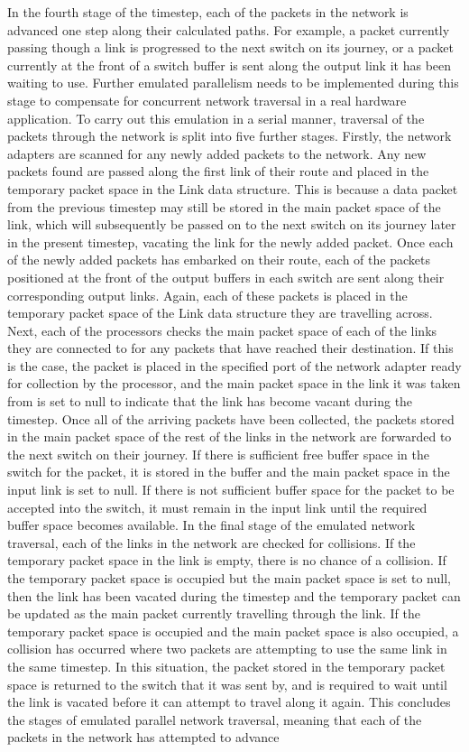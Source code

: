 \documentclass[a4paper, 12pt]{article}
\begin{document}
In the fourth stage of the timestep, each of the packets in the network is advanced one step along their calculated paths. For example, a packet currently passing though a link is progressed to the next switch on its journey, or a packet currently at the front of a switch buffer is sent along the output link it has been waiting to use. Further emulated parallelism needs to be implemented during this stage to compensate for concurrent network traversal in a real hardware application. To carry out this emulation in a serial manner, traversal of the packets through the network is split into five further stages. Firstly, the network adapters are scanned for any newly added packets to the network. Any new packets found are passed along the first link of their route and placed in the temporary packet space in the Link data structure. This is because a data packet from the previous timestep may still be stored in the main packet space of the link, which will subsequently be passed on to the next switch on its journey later in the present timestep, vacating the link for the newly added packet. Once each of the newly added packets has embarked on their route, each of the packets positioned at the front of the output buffers in each switch are sent along their corresponding output links. Again, each of these packets is placed in the temporary packet space of the Link data structure they are travelling across. Next, each of the processors checks the main packet space of each of the links they are connected to for any packets that have reached their destination. If this is the case, the packet is placed in the specified port of the network adapter ready for collection by the processor, and the main packet space in the link it was taken from is set to null to indicate that the link has become vacant during the timestep. Once all of the arriving packets have been collected, the packets stored in the main packet space of the rest of the links in the network are forwarded to the next switch on their journey. If there is sufficient free buffer space in the switch for the packet, it is stored in the buffer and the main packet space in the input link is set to null. If there is not sufficient buffer space for the packet to be accepted into the switch, it must remain in the input link until the required buffer space becomes available. In the final stage of the emulated network traversal, each of the links in the network are checked for collisions. If the temporary packet space in the link is empty, there is no chance of a collision. If the temporary packet space is occupied but the main packet space is set to null, then the link has been vacated during the timestep and the temporary packet can be updated as the main packet currently travelling through the link. If the temporary packet space is occupied and the main packet space is also occupied, a collision has occurred where two packets are attempting to use the same link in the same timestep. In this situation, the packet stored in the temporary packet space is returned to the switch that it was sent by, and is required to wait until the link is vacated before it can attempt to travel along it again. This concludes the stages of emulated parallel network traversal, meaning that each of the packets in the network has attempted to advance 
\end{document}
